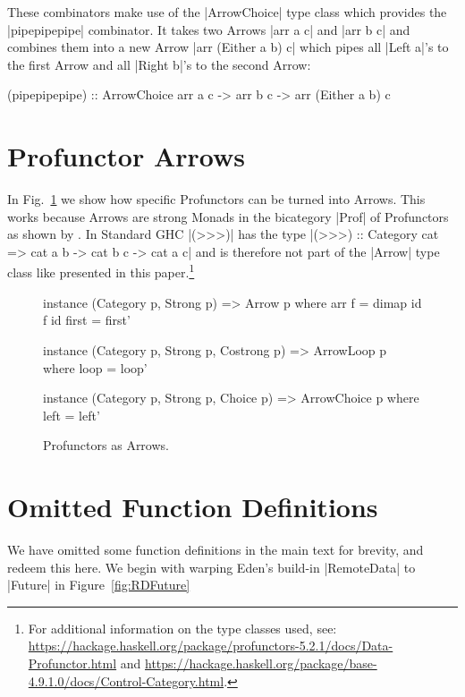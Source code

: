 These combinators make use of the |ArrowChoice| type class which provides the |pipepipepipe| combinator. It takes two Arrows |arr a c| and |arr b c| and combines them into a new Arrow |arr (Either a b) c| which pipes all |Left a|'s to the first Arrow and all |Right b|'s to the second Arrow:
\begin{code}
(pipepipepipe) :: ArrowChoice arr a c -> arr b c -> arr (Either a b) c
\end{code}

\section{Profunctor Arrows}
\label{app:profunctorArrows}

In Fig.~\ref{fig:profunctorArrow} we show how specific Profunctors can be turned into Arrows. This works because Arrows are strong Monads in the bicategory |Prof| of Profunctors as shown by \citet{Asada:2010:ASM:1863597.1863607}. In Standard GHC |(>>>)| has the type |(>>>) :: Category cat => cat a b -> cat b c -> cat a c| and is therefore not part of the |Arrow| type class like presented in this paper.\footnote{For additional information on the type classes used, see: \url{https://hackage.haskell.org/package/profunctors-5.2.1/docs/Data-Profunctor.html} and \url{https://hackage.haskell.org/package/base-4.9.1.0/docs/Control-Category.html}.}


\begin{figure}[h]
\begin{code}
instance (Category p, Strong p) => Arrow p where
  arr f = dimap id f id
  first = first'

instance (Category p, Strong p, Costrong p) => ArrowLoop p where
  loop = loop'

instance (Category p, Strong p, Choice p) => ArrowChoice p where
  left = left'
\end{code}
\caption{Profunctors as Arrows.}
\label{fig:profunctorArrow}
\end{figure}

\section{Omitted Function Definitions}
\label{app:omitted}
We have omitted some function definitions in the main text for
brevity, and redeem this here.
%
%
%
We begin with warping Eden's build-in |RemoteData| to |Future| in
Figure~\ref{fig:RDFuture}

